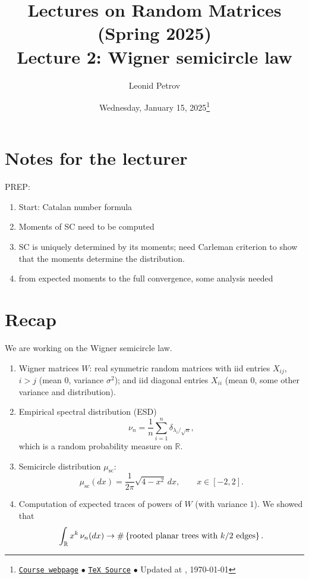 \documentclass[letterpaper,11pt,oneside,reqno]{article}
\numberwithin{equation}{section}
\theoremstyle{definition}
\newenvironment{lnotes}{\section*{Notes for the lecturer}}{}
\begin{document}
\title{Lectures on Random Matrices
(Spring 2025) \\Lecture 2: Wigner semicircle law}


\date{Wednesday, January 15, 2025\footnote{\href{https://lpetrov.cc/rmt25/}{\texttt{Course webpage}}
$\bullet$ \href{https://lpetrov.cc/rmt25/rmt25-notes/rmt2025-l02.tex}{\texttt{TeX Source}}
$\bullet$
Updated at \currenttime, \today}}



\author{Leonid Petrov}


\maketitle

\tableofcontents



\begin{lnotes}
	PREP:
	\begin{enumerate}
		\item Start:
			Catalan number formula
		\item Moments of SC need to be computed
		\item
			SC is uniquely determined by its moments; need Carleman criterion to show that the moments determine the distribution.
		\item from expected moments to the full convergence, some analysis needed
	\end{enumerate}
\end{lnotes}


\section{Recap}

We are working on the Wigner semicircle law.
\begin{enumerate}
	\item Wigner matrices $W$:
		real symmetric random matrices with iid entries
		$X_{ij}$, $i>j$ (mean 0, variance $\sigma^2$);
		and iid diagonal entries $X_{ii}$ (mean 0, some other variance and distribution).
	\item Empirical spectral distribution (ESD)
		\begin{equation*}
			\nu_n = \frac{1}{n} \sum_{i=1}^{n} \delta_{\lambda_i/\sqrt{n}},
		\end{equation*}
		which is a random probability measure on $\mathbb{R}$.
	\item Semicircle distribution $\mu_{\mathrm{sc}}$:
		\begin{equation*}
			\mu_{\mathrm{sc}}(dx) = \frac{1}{2\pi} \sqrt{4-x^2} \, dx,
			\qquad x \in [-2,2].
		\end{equation*}
	\item Computation of expected traces of powers of $W$
		(with variance $1$). We
		showed that
		\begin{equation*}
		\int_{\mathbb{R}} x^k \, \nu_n(dx) \to
			\#\left\{ \textnormal{rooted planar trees with $k/2$ edges} \right\}.
		\end{equation*}
\end{enumerate}
\end{document}
